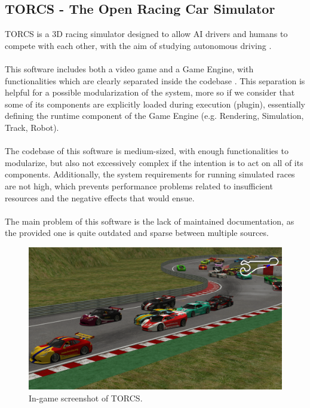 \subsection{TORCS - The Open Racing Car Simulator}
TORCS is a 3D racing simulator designed to allow AI drivers and humans to compete with each other, with the aim of studying autonomous driving \cite{site:torcs-website}. \\ \\
This software includes both a video game and a Game Engine, with functionalities which are clearly separated inside the codebase \cite{site:torcs-source}. This separation is helpful for a possible modularization of the system, more so if we consider that some of its components are explicitly loaded during execution (plugin), essentially defining the runtime component of the Game Engine (e.g. Rendering, Simulation, Track, Robot). \\ \\
The codebase of this software is medium-sized, with enough functionalities to modularize, but also not excessively complex if the intention is to act on all of its components. Additionally, the system requirements for running simulated races are not high, which prevents performance problems related to insufficient resources and the negative effects that would ensue. \\ \\
The main problem of this software is the lack of maintained documentation, as the provided one is quite outdated and sparse between multiple sources.

\begin{figure}
	\centering
	\includegraphics[width=0.8\linewidth]{"immagini/Feasibility study/TORCS"}
	\caption[In-game screenshot of TORCS.]{In-game screenshot of TORCS.}
	\label{fig:torcs}
\end{figure}


